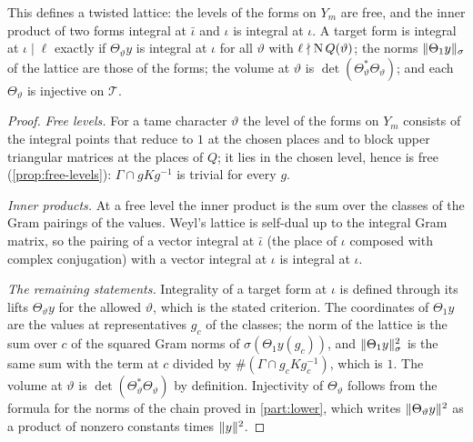 \begin{proposition}\label{prop:target-lattice}
This defines a twisted lattice: the levels of the forms on $Y_m$ are free, and the inner product of two forms integral at $\bar\iota$ and $\iota$ is
integral at $\iota$. A target form is integral at $\iota\mid\ell$ exactly if $\Theta_\vartheta y$ is integral at $\iota$ for all $\vartheta$ with $\ell\nmid\operatorname{N} Q(\vartheta)$; the
norms $\lVert \Theta_1y\rVert_\sigma$ of the lattice are those of the forms; the volume at $\vartheta$ is $\det(\Theta_\vartheta^*\Theta_\vartheta)$; and each $\Theta_\vartheta$ is
injective on $\mathcal T$.
\end{proposition}

\begin{proof}
\emph{Free levels.} For a tame character $\vartheta$ the level of the forms on $Y_m$ consists of the integral points that reduce to $1$ at the chosen places and to block upper triangular matrices at the places of $Q$; it lies in the chosen level, hence is free (\cref{prop:free-levels}): $\Gamma\cap gKg^{-1}$ is trivial for every $g$.

\emph{Inner products.} At a free level the inner product is the sum over the classes of the Gram pairings of the values. Weyl's lattice is self-dual up to the integral Gram matrix, so the pairing of a vector integral at $\bar\iota$ (the place of $\iota$ composed with complex conjugation) with a vector integral at $\iota$ is integral at $\iota$.

\emph{The remaining statements.} Integrality of a target form at $\iota$ is defined through its lifts $\Theta_\vartheta y$ for the allowed $\vartheta$, which is the stated criterion. The coordinates of $\Theta_1y$ are the values at representatives $g_c$ of the classes; the norm of the lattice is the sum over $c$ of the squared Gram norms of $\sigma(\Theta_1y(g_c))$, and $\lVert \Theta_1y\rVert^2_\sigma$
is the same sum with the term at $c$ divided by $\#(\Gamma\cap g_cKg_c^{-1})$, which is $1$. The volume at $\vartheta$ is $\det(\Theta_\vartheta^*\Theta_\vartheta)$ by definition. Injectivity of $\Theta_\vartheta$ follows from the formula for the norms of the chain proved in \cref{part:lower}, which writes $\lVert \Theta_\vartheta y\rVert^2$ as a product of nonzero constants times $\lVert y\rVert^2$.
\end{proof}

